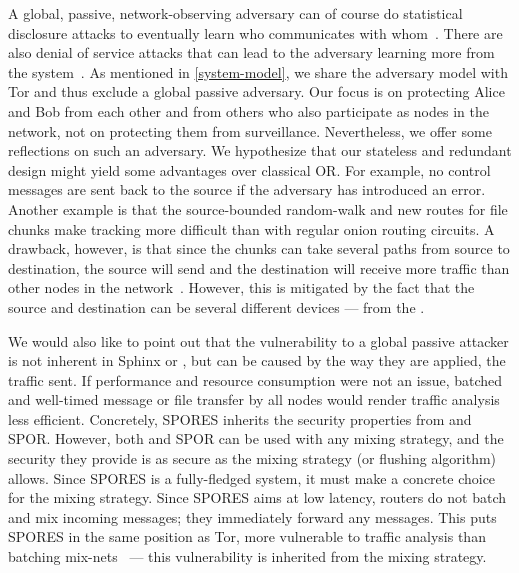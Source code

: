 A global, passive, network-observing adversary can of course do
statistical disclosure attacks to eventually learn who communicates
with whom~\cite{StatisticalDisclosureAttacks}. There are also denial
of service attacks that can lead to the adversary learning more from
the system~\cite{DenialOfSecurity}.  As mentioned in
\cref{system-model}, we share the adversary model with Tor
and thus exclude a global passive adversary. Our focus is on
protecting Alice and Bob from each other and from others who also
participate as nodes in the network, not on protecting them from
surveillance. Nevertheless, we offer some reflections on such an
adversary. We hypothesize that our stateless and redundant design
might yield some advantages over classical \ac{OR}. For
example, no control messages are sent back to the source if the
adversary has introduced an error.     Another example is that the source-bounded
random-walk and new routes for file chunks make tracking more
difficult than with regular onion routing circuits. A drawback, however, is
that since the chunks can take several paths from source to destination, the source 
will send and the destination will receive more traffic than other nodes in the 
network~\cite{RoutingSurveyAnonymousProtocols}. However, this is mitigated by the fact that the source and 
destination can be several different devices --- \ie from the \squads.


We would also like to point out that the
vulnerability to a global passive attacker is not inherent in Sphinx
or \Sphinxes, but can be caused by the way they are applied, \ie the
traffic sent. If performance and resource consumption were not an
issue, batched and well-timed message or file transfer by all nodes
would render traffic analysis less efficient. Concretely, \Ac{SPORES} inherits 
the security properties from \Sphinxes and \ac{SPOR}.
However, both \Sphinxes and \ac{SPOR} can be used with any mixing strategy, and 
the security they provide is as secure as the mixing strategy (or flushing 
algorithm) allows.
Since \ac{SPORES} is a fully-fledged system, it must make a concrete choice for 
the mixing strategy.
Since \ac{SPORES} aims at low latency, routers do not batch and mix incoming 
messages; they immediately forward any messages.
This puts \ac{SPORES} in the same position as Tor, \ie more vulnerable to 
traffic analysis than batching mix-nets~\cite{RoutingSurveyAnonymousProtocols} 
 --- this 
vulnerability is inherited from the mixing strategy.





